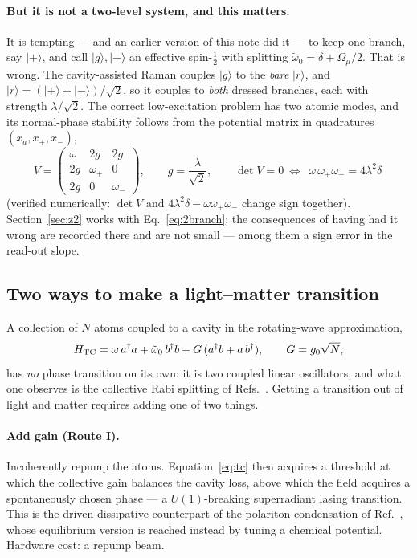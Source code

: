 \documentclass[11pt,a4paper]{article}
\newcommand{\dg}{^{\dagger}}
\newcommand{\Omu}{\Omega_{\mu}}
\newcommand{\wt}{\tilde{\omega}_{0}}
\newcommand{\ket}[1]{\lvert #1 \rangle}
\begin{document}
\paragraph{But it is not a two-level system, and this matters.} It is tempting --- and an
earlier version of this note did it --- to keep one branch, say $\ket{+}$, and call
$\ket{g},\ket{+}$ an effective spin-$\tfrac12$ with splitting $\wt=\delta+\Omu/2$. That is
wrong. The cavity-assisted Raman couples $\ket{g}$ to the \emph{bare} $\ket{r}$, and
$\ket{r}=(\ket{+}+\ket{-})/\sqrt2$, so it couples to \emph{both} dressed branches, each with
strength $\lambda/\sqrt2$. The correct low-excitation problem has two atomic modes, and its
normal-phase stability follows from the potential matrix in quadratures
$(x_a,x_+,x_-)$,
\begin{equation}
  V = \begin{pmatrix} \omega & 2g & 2g\\ 2g & \omega_+ & 0\\ 2g & 0 & \omega_-\end{pmatrix},
  \qquad g=\frac{\lambda}{\sqrt2},
  \qquad \det V = 0 \ \Longleftrightarrow\
  \boxed{\ \omega\,\omega_+\omega_- = 4\lambda^2\delta\ }
  \label{eq:2branch}
\end{equation}
(verified numerically: $\det V$ and $4\lambda^2\delta-\omega\omega_+\omega_-$ change sign
together). Section~\ref{sec:z2} works with Eq.~\eqref{eq:2branch}; the consequences of having
had it wrong are recorded there and are not small --- among them a sign error in the
read-out slope.

\subsection{Two ways to make a light--matter transition}
\label{sec:tworoutes}

A collection of $N$ atoms coupled to a cavity in the rotating-wave approximation,
\begin{equation}
  H_{\rm TC} = \omega\,a\dg a + \wt\, b\dg b + G\,(a\dg b + a\,b\dg), \qquad G = g_0\sqrt N,
  \label{eq:tc}
\end{equation}
has \emph{no} phase transition on its own: it is two coupled linear oscillators, and what one
observes is the collective Rabi splitting of Refs.~\cite{Yang2020,Wang2023}. Getting a
transition out of light and matter requires adding one of two things.

\paragraph{Add gain (Route I).} Incoherently repump the atoms. Equation~\eqref{eq:tc} then
acquires a threshold at which the collective gain balances the cavity loss, above which the
field acquires a spontaneously chosen phase --- a $U(1)$-breaking superradiant lasing
transition. This is the driven-dissipative counterpart of the polariton condensation of
Ref.~\cite{Zhang2013}, whose equilibrium version is reached instead by tuning a chemical
potential. Hardware cost: a repump beam.
\end{document}
